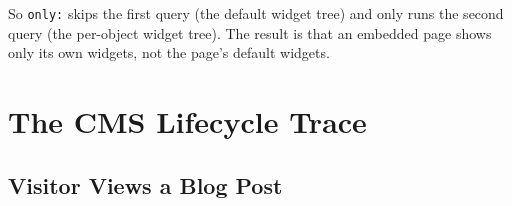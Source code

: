 \documentclass[11pt,a4paper]{article}
\begin{document}
So \texttt{only:} skips the first query (the default widget tree) and
only runs the second query (the per-object widget tree). The result is
that an embedded page shows only its own widgets, not the page's default
widgets.

\section{The CMS Lifecycle Trace}\label{sec:trace}

\subsection{Visitor Views a Blog Post}
\end{document}
